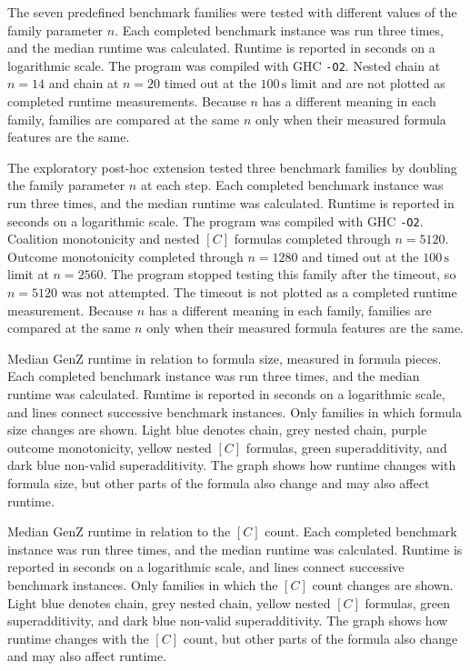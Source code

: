 
\caption{The seven predefined benchmark families were tested with different values of the family parameter \(n\). Each completed benchmark instance was run three times, and the median runtime was calculated. Runtime is reported in seconds on a logarithmic scale. The program was compiled with GHC \texttt{-O2}. Nested chain at \(n=14\) and chain at \(n=20\) timed out at the \(100\,\mathrm{s}\) limit and are not plotted as completed runtime measurements. Because \(n\) has a different meaning in each family, families are compared at the same \(n\) only when their measured formula features are the same.}
\label{fig:runtime-vs-n}

\caption{The exploratory post-hoc extension tested three benchmark families by doubling the family parameter \(n\) at each step. Each completed benchmark instance was run three times, and the median runtime was calculated. Runtime is reported in seconds on a logarithmic scale. The program was compiled with GHC \texttt{-O2}. Coalition monotonicity and nested \([C]\) formulas completed through \(n=5120\). Outcome monotonicity completed through \(n=1280\) and timed out at the \(100\,\mathrm{s}\) limit at \(n=2560\). The program stopped testing this family after the timeout, so \(n=5120\) was not attempted. The timeout is not plotted as a completed runtime measurement. Because \(n\) has a different meaning in each family, families are compared at the same \(n\) only when their measured formula features are the same.}
\label{fig:posthoc-runtime}

\caption{Median GenZ runtime in relation to formula size, measured in formula pieces. Each completed benchmark instance was run three times, and the median runtime was calculated. Runtime is reported in seconds on a logarithmic scale, and lines connect successive benchmark instances. Only families in which formula size changes are shown. Light blue denotes chain, grey nested chain, purple outcome monotonicity, yellow nested \([C]\) formulas, green superadditivity, and dark blue non-valid superadditivity. The graph shows how runtime changes with formula size, but other parts of the formula also change and may also affect runtime.}
\label{fig:formula-size}

\caption{Median GenZ runtime in relation to the \([C]\) count. Each completed benchmark instance was run three times, and the median runtime was calculated. Runtime is reported in seconds on a logarithmic scale, and lines connect successive benchmark instances. Only families in which the \([C]\) count changes are shown. Light blue denotes chain, grey nested chain, yellow nested \([C]\) formulas, green superadditivity, and dark blue non-valid superadditivity. The graph shows how runtime changes with the \([C]\) count, but other parts of the formula also change and may also affect runtime.}
\label{fig:c-count}

